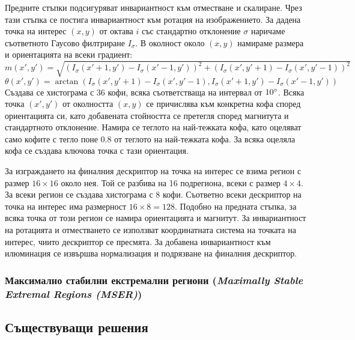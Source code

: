 \documentclass[a4paper,12pt]{article}
\begin{document}
\bigbreak

Предните стъпки подсигуряват инвариантност към отместване и скалиране. Чрез тази стъпка се постига инвариантност към ротация на изображението. За дадена точка на интерес $(x, y)$ от октава $i$ със стандартно отклонение $\sigma$ наричаме съответното Гаусово филтриране $I_{\sigma}$. В околност около $(x, y)$ намираме размера и ориентацията на всеки градиент: \\

$m(x', y') = \sqrt{(I_{\sigma}(x'+1,y') - I_{\sigma}(x'-1,y'))^2 + (I_{\sigma}(x', y'+1) - I_{\sigma}(x', y'-1))^2}$ \\
$\theta(x', y') = \arctan(I_{\sigma}(x',y'+1) - I_{\sigma}(x',y'-1), I_{\sigma}(x'+1,y') - I_{\sigma}(x'-1, y'))$ \\

Създава се хистограма с 36 кофи, всяка съответстваща на интервал от $10\degree$. Всяка точка $(x', y')$ от околността $(x, y)$ се причислява към конкретна кофа според ориентацията си, като добавената стойността се претегля според магнитута и стандартното отклонение. Намира се теглото на най-тежката кофа, като оцеляват само кофите с тегло поне $0.8$ от теглото на най-тежката кофа. За всяка оцеляла кофа се създава ключова точка с тази ориентация.

\bigbreak

За изграждането на финалния дескриптор на точка на интерес се взима регион с размер $16 \times 16$ около нея. Той се разбива на 16 подрегиона, всеки с размер $4 \times 4$. За всеки регион се създава хистограма с 8 кофи. Съответно всеки дескриптор на точка на интерес има размерност $16 \times 8 = 128$. Подобно на предната стъпка, за всяка точка от този регион се намира ориентацията и магнитут. За инвариантност на ротацията и отместването се използват координатната система на точката на интерес, чиито дескриптор се пресмята. За добавена инвариантност към илюминация се извършва нормализация и подрязване на финалния дескриптор.

\subsubsection{Максимално стабилни екстремални региони (\textit{Maximally Stable Extremal Regions (MSER)})}

\subsection{Съществуващи решения}
\end{document}
